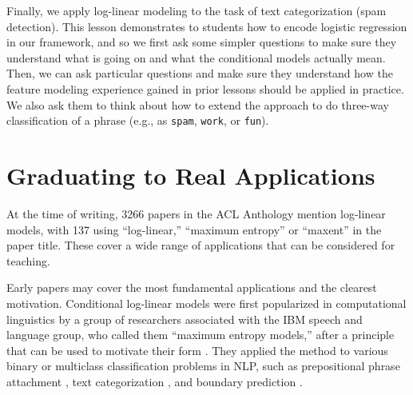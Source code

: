 \documentclass[11pt,letterpaper]{article}
\begin{document}
Finally, we apply log-linear modeling to the task of text categorization (spam detection). This lesson demonstrates to students how to encode logistic regression in our framework, and so 
we first ask some simpler questions to make sure they understand what is going on and what the conditional models actually mean.
Then, we can ask particular questions and make sure they understand how the feature modeling experience gained in 
prior lessons should be applied in practice. We also ask them to think about how to extend the approach to do three-way classification 
of a phrase (e.g., as \texttt{spam}, \texttt{work}, or \texttt{fun}).



\section{Graduating to Real Applications}\label{sec:history}

At the time of writing, 3266 papers in the ACL Anthology mention
log-linear models, with 137 using ``log-linear,'' ``maximum entropy''
or ``maxent'' in the paper title.  These cover a wide range of
applications that can be considered for teaching.

Early papers may cover the most fundamental applications and the
clearest motivation.  Conditional log-linear models were first
popularized in computational linguistics by a group of researchers
associated with the IBM speech and language group, who called them
``maximum entropy models,'' after a principle that can be used to
motivate their form \cite{jaynes-1957}.  They applied the method to
various binary or multiclass classification problems in NLP, such as
prepositional phrase attachment \cite{ratnaparkhi-1994}, text
categorization \cite{nigam-lafferty-mccallum-1999}, and boundary
prediction \cite{beeferman-berger-lafferty-1999}.
\end{document}
